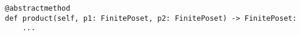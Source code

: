 \par\begin{minipage}{67ex}
\begin{verbatim}
@abstractmethod
def product(self, p1: FinitePoset, p2: FinitePoset) -> FinitePoset:
    ...
\end{verbatim}
\end{minipage}\par